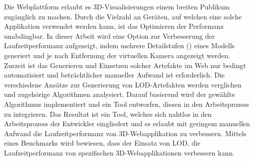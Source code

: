 Die Webplattform erlaubt es 3D-Visualisierungen einem breiten Publikum zugänglich zu machen. Durch die Vielzahl an Geräten, auf welchen eine solche Applikation verwendet werden kann, ist das Optimieren der Performanz unabdingbar. In dieser Arbeit wird eine Option zur Verbesserung der Laufzeitperformanz aufgezeigt, indem mehrere Detailstufen () eines Modells generiert und je nach Entfernung der virtuellen Kamera angezeigt werden.
\bigbreak
Zurzeit ist das Generieren und Einsetzen solcher Artefakte im Web nur bedingt automatisiert und beträchtlicher manueller Aufwand ist erforderlich.
Die verschiedene Ansätze zur Generierung von LOD-Artefakten werden verglichen und zugehörige Algorithmen analysiert.
Darauf basierend wird der gewählte Algorithmus implementiert und ein Tool entworfen, diesen in den Arbeitsprozess zu integrieren.
\bigbreak
Das Resultat ist ein Tool, welches sich nahtlos in den Arbeitsprozess der Entwickler eingliedert und es erlaubt mit geringem manuellen Aufwand die Laufzeitperformanz von 3D-Webapplikation zu verbessern.
Mittels eines Benchmarks wird bewiesen, dass der Einsatz von LOD, die Laufzeitperformanz von spezifischen 3D-Webapplikationen verbessern kann.
